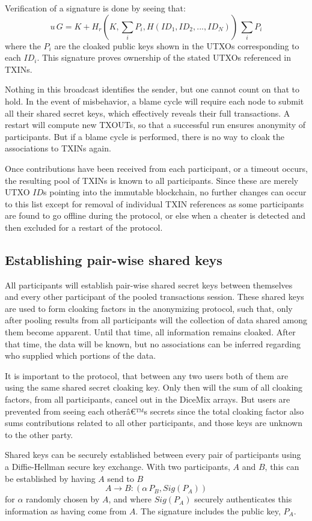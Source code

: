 \documentclass[8pt,fleqn,openany]{book}
\begin{document}
{		Verification of a signature is done by seeing that:
		$$u \, G = K + H_r(K, \sum_i{P_i}, H(ID_1, ID_2, ..., ID_N)) \, \sum_i{P_i}$$
		where the $P_i$ are the cloaked public keys shown in the UTXOs corresponding to each $ID_i$. This signature proves ownership of the stated UTXOs referenced in TXINs.
		
		Nothing in this broadcast identifies the sender, but one cannot count on that to hold. In the event of misbehavior, a blame cycle will require each node to submit all their shared secret keys, which effectively reveals their full transactions. A restart will compute new TXOUTs, so that a successful run ensures anonymity of participants. But if a blame cycle is performed, there is no way to cloak the associations to TXINs again.
		
		Once contributions have been received from each participant, or a timeout occurs, the resulting pool of TXINs is known to all participants. Since these are merely UTXO $ID$s pointing into the immutable blockchain, no further changes can occur to this list except for removal of individual TXIN references as some participants are found to go offline during the protocol, or else when a cheater is detected and then excluded for a restart of the protocol.
		
		\subsection{Establishing pair-wise shared keys} 
		All participants will establish pair-wise shared secret keys between themselves and every other participant of the pooled transactions session. These shared keys are used to form cloaking factors in the anonymizing protocol, such that, only after pooling results from all participants will the collection of data shared among them become apparent. Until that time, all information remains cloaked. After that time, the data will be known, but no associations can be inferred regarding who supplied which portions of the data. 
		
		It is important to the protocol, that between any two users both of them are using the same shared secret cloaking key. Only then will the sum of all cloaking factors, from all participants, cancel out in the DiceMix arrays. But users are prevented from seeing each otherâ€™s secrets since the total cloaking factor also sums contributions related to all other participants, and those keys are unknown to the other party.
		
		Shared keys can be securely established between every pair of participants using a Diffie-Hellman secure key exchange\cite{c21}. With two participants, $A$ and $B$, this can be established by having $A$ send to $B$
		$$A \rightarrow B: (\alpha \, P_B, Sig(P_A))$$
		for $\alpha$ randomly chosen by $A$, and where $Sig(P_A)$ securely authenticates this information as having come from $A$. The signature includes the public key, $P_A$. 
		
}
\end{document}
